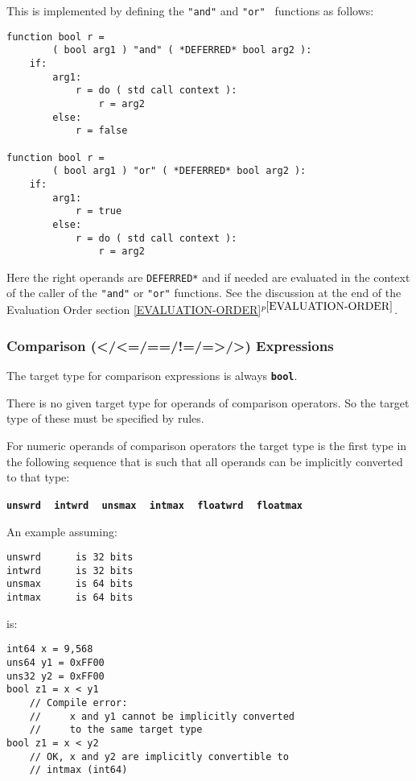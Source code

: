 \documentclass[12pt]{article}
\newcommand{\TT}[1]{{\tt \bfseries #1}}
\newcommand{\itemref}[1]{\ref{#1}$^{p\pageref{#1}}$}
\newenvironment{indpar}[1][0.3in]%
	{\begin{list}{}%
		     {\setlength{\itemsep}{0in}%
		      \setlength{\topsep}{0in}%
		      \setlength{\parsep}{1ex}%
		      \setlength{\labelwidth}{#1}%
		      \setlength{\leftmargin}{#1}%
		      \addtolength{\leftmargin}{\labelsep}}%
	 \item}%
	{\end{list}}
\begin{document}
This is implemented by defining
the {\tt "and"} and {\tt "or" } functions as follows:

\begin{indpar}\begin{verbatim}
function bool r =
        ( bool arg1 ) "and" ( *DEFERRED* bool arg2 ):
    if:
        arg1:
            r = do ( std call context ):
                r = arg2
        else:
            r = false

function bool r =
        ( bool arg1 ) "or" ( *DEFERRED* bool arg2 ):
    if:
        arg1:
            r = true
        else:
            r = do ( std call context ):
                r = arg2
\end{verbatim}\end{indpar}

Here the right operands are {\tt *DEFERRED*} and if needed are
evaluated in the context of the caller of the {\tt "and"} or
{\tt "or"} functions.
See the discussion at the end of the Evaluation Order section
\itemref{EVALUATION-ORDER}.


\subsubsection{Comparison (</<=/==/!=/=>/>) Expressions}
\label{COMPARISON-EXPRESSIONS}

The target type for comparison expressions is always \TT{bool}.

There is no given target type for operands of comparison operators.
So the target type of these must be specified by rules.

For numeric operands of comparison operators
the target type is the first type
in the following sequence that is such that all operands
can be implicitly converted to that type:
\begin{center}
\TT{unswrd} ~ \TT{intwrd} ~ \TT{unsmax} ~ \TT{intmax}
           ~ \TT{floatwrd} ~ \TT{floatmax}
\end{center}

An example assuming:


\begin{indpar}\begin{verbatim}
unswrd      is 32 bits
intwrd      is 32 bits
unsmax      is 64 bits
intmax      is 64 bits
\end{verbatim}\end{indpar}

is:

\begin{indpar}\begin{verbatim}
int64 x = 9,568
uns64 y1 = 0xFF00
uns32 y2 = 0xFF00
bool z1 = x < y1
    // Compile error:
    //     x and y1 cannot be implicitly converted
    //     to the same target type
bool z1 = x < y2
    // OK, x and y2 are implicitly convertible to
    // intmax (int64)
\end{verbatim}\end{indpar}
\end{document}
